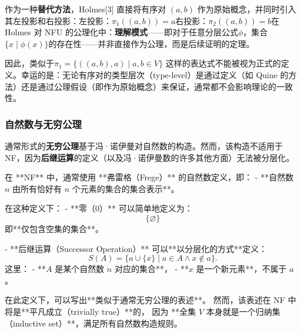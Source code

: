 作为一种\textbf{替代方法}，Holmes[3] 直接将有序对 \( (a, b) \) 作为原始概念，并同时引入其左投影和右投影：左投影：\(\pi_1((a, b)) = a\)右投影：\(\pi_2((a, b)) = b\)在Holmes 对 NFU 的公理化中：\textbf{理解模式}——即对于任意分层公式\(\phi\)，集合\(\{x \mid \phi(x)\}\)的存在性——并非直接作为公理，而是后续证明的定理。

因此，类似于\(\pi_1 = \{((a, b), a) \mid a, b \in V\}\)
这样的表达式不能被视为正式的定义。幸运的是：无论有序对的类型层次（type-level）是通过定义（如 Quine 的方法）还是通过公理假设（即作为原始概念）来保证，通常都不会影响理论的一致性。
\subsubsection{自然数与无穷公理} 
通常形式的\textbf{无穷公理}基于冯·诺伊曼对自然数的构造。然而，该构造不适用于 NF，因为\textbf{后继运算}的定义（以及冯·诺伊曼数的许多其他方面）无法被分层化。  

在 **NF** 中，通常使用 **弗雷格（Frege）** 的自然数定义，即：
- **自然数 \( n \) 由所有恰好有 \( n \) 个元素的集合的集合表示**。

在这种定义下：
- **零（0）** 可以简单地定义为：
  \[
  \{ \varnothing \}
  \]
  即**仅包含空集的集合**。

- **后继运算（Successor Operation）** 可以**以分层化的方式**定义：
  \[
  S(A) = \{ a \cup \{x\} \mid a \in A \land x \notin a \}.
  \]
  这里：
  - **\( A \) 是某个自然数 \( n \) 对应的集合**，
  - **\( x \) 是一个新元素**，不属于 \( a \)。

在此定义下，可以写出**类似于通常无穷公理的表述**。  
然而，该表述在 NF 中将是**平凡成立（trivially true）**的，  
因为 **全集 \( V \) 本身就是一个归纳集（inductive set）**，满足所有自然数构造规则。
